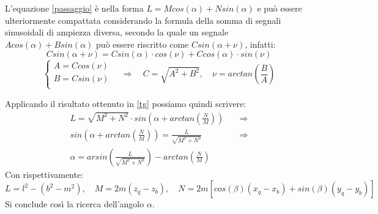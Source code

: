 \documentclass[11pt]{article}
\begin{document}
L'equazione \eqref{passaggio} è nella forma $L=Mcos(\alpha)+Nsin(\alpha)$ e può essere ulteriormente compattata considerando la formula della somma di segnali sinusoidali di ampiezza diversa, secondo la quale un segnale $Acos(\alpha)+Bsin(\alpha)$ può essere riscritto come $Csin(\alpha + \nu)$, infatti:
\begin{equation}\label{c}
Csin(\alpha + \nu)=Csin(\alpha)\cdot cos(\nu)+Ccos(\alpha)\cdot sin(\nu)
\end{equation}
\begin{equation}\label{tg}
    \begin{cases}
      A=Ccos(\nu)\\
      B=Csin(\nu)\\
    \end{cases}\quad \Rightarrow \quad  C=\sqrt{A^2+B^2}, \quad \nu=arctan\left(\frac{B}{A}\right)
\end{equation}

Applicando il risultato ottenuto in \eqref{tg} possiamo quindi scrivere:
\begin{align}\label{alfa}
    L= \sqrt{M^2+N^2}\cdot sin\left(\alpha+arctan\left(\frac{N}{M}\right)\right) \quad  &\Rightarrow\\ sin\left(\alpha+arctan\left(\frac{N}{M}\right)\right)=\frac{L}{\sqrt{M^2+N^2}}  \quad  &\Rightarrow\\
    \alpha=arsin\left(\frac{L}{\sqrt{M^2+N^2}}\right)-arctan\left(\frac{N}{M}\right)
\end{align}
Con rispettivamente:
\begin{equation}\label{lnm}
L=l^2-(b^2-m^2), \quad M=2m(z_q-z_b), \quad N=2m[cos(\beta)(x_q-x_b)+sin(\beta)(y_q-y_b)]
\end{equation}
Si conclude così la ricerca dell'angolo $\alpha$.
\end{document}
